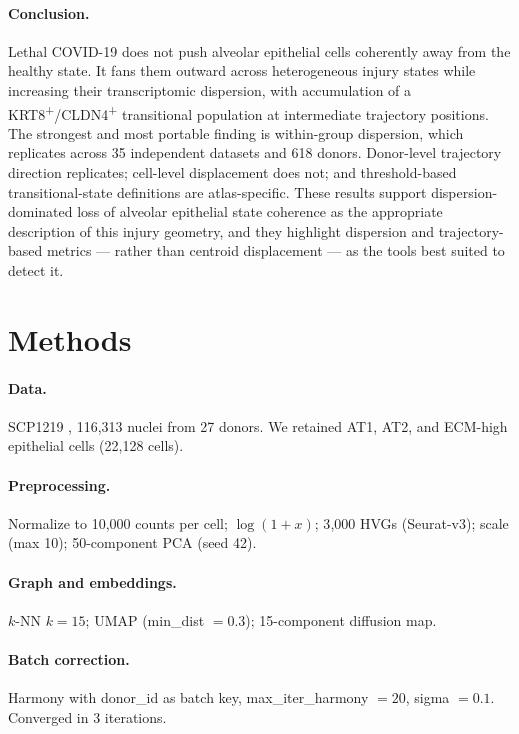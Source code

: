 \documentclass[11pt]{article}
\begin{document}
\paragraph{Conclusion.} Lethal COVID-19 does not push alveolar epithelial cells coherently away from the healthy state. It fans them outward across heterogeneous injury states while increasing their transcriptomic dispersion, with accumulation of a KRT8\textsuperscript{+}/CLDN4\textsuperscript{+} transitional population at intermediate trajectory positions. The strongest and most portable finding is within-group dispersion, which replicates across 35 independent datasets and 618 donors. Donor-level trajectory direction replicates; cell-level displacement does not; and threshold-based transitional-state definitions are atlas-specific. These results support dispersion-dominated loss of alveolar epithelial state coherence as the appropriate description of this injury geometry, and they highlight dispersion and trajectory-based metrics --- rather than centroid displacement --- as the tools best suited to detect it.

\section*{Methods}

\paragraph{Data.} SCP1219 \citep{Melms2021}, 116{,}313 nuclei from 27 donors. We retained AT1, AT2, and ECM-high epithelial cells (22{,}128 cells).

\paragraph{Preprocessing.} Normalize to 10{,}000 counts per cell; $\log(1+x)$; 3{,}000 HVGs (Seurat-v3); scale (max 10); 50-component PCA (seed 42).

\paragraph{Graph and embeddings.} $k$-NN $k = 15$; UMAP (min\_dist $= 0.3$); 15-component diffusion map.

\paragraph{Batch correction.} Harmony \citep{Korsunsky2019} with donor\_id as batch key, max\_iter\_harmony $= 20$, sigma $= 0.1$. Converged in 3 iterations.
\end{document}
